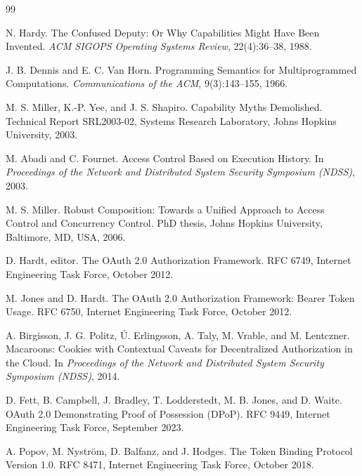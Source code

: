 \documentclass[11pt]{article}
\begin{document}
\begin{thebibliography}{99}

N. Hardy.
\newblock The Confused Deputy: Or Why Capabilities Might Have Been Invented.
\newblock \emph{ACM SIGOPS Operating Systems Review}, 22(4):36--38, 1988.

J. B. Dennis and E. C. Van Horn.
\newblock Programming Semantics for Multiprogrammed Computations.
\newblock \emph{Communications of the ACM}, 9(3):143--155, 1966.

M. S. Miller, K.-P. Yee, and J. S. Shapiro.
\newblock Capability Myths Demolished.
\newblock Technical Report SRL2003-02, Systems Research Laboratory, Johns
Hopkins University, 2003.

M. Abadi and C. Fournet.
\newblock Access Control Based on Execution History.
\newblock In \emph{Proceedings of the Network and Distributed System Security
Symposium (NDSS)}, 2003.

M. S. Miller.
\newblock Robust Composition: Towards a Unified Approach to Access Control and
Concurrency Control.
\newblock PhD thesis, Johns Hopkins University, Baltimore, MD, USA, 2006.

D. Hardt, editor.
\newblock The OAuth 2.0 Authorization Framework.
\newblock RFC 6749, Internet Engineering Task Force, October 2012.

M. Jones and D. Hardt.
\newblock The OAuth 2.0 Authorization Framework: Bearer Token Usage.
\newblock RFC 6750, Internet Engineering Task Force, October 2012.

A. Birgisson, J. G. Politz, \'U. Erlingsson, A. Taly, M. Vrable, and
M. Lentczner.
\newblock Macaroons: Cookies with Contextual Caveats for Decentralized
Authorization in the Cloud.
\newblock In \emph{Proceedings of the Network and Distributed System Security
Symposium (NDSS)}, 2014.

D. Fett, B. Campbell, J. Bradley, T. Lodderstedt, M. B. Jones, and D. Waite.
\newblock OAuth 2.0 Demonstrating Proof of Possession (DPoP).
\newblock RFC 9449, Internet Engineering Task Force, September 2023.

A. Popov, M. Nystr\"om, D. Balfanz, and J. Hodges.
\newblock The Token Binding Protocol Version 1.0.
\newblock RFC 8471, Internet Engineering Task Force, October 2018.


\end{thebibliography}
\end{document}

